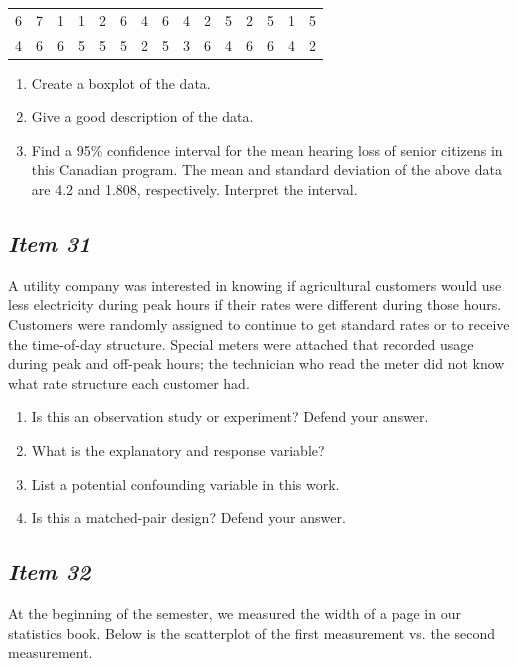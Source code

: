 \documentclass[twoside,openany]{tufte-book}
\begin{document}
\begin{table}[!ht]
\begin{center}
\begin{tabular}{lllllllllllllll}
6 & 7 & 1 & 1 & 2 & 6 & 4 & 6 & 4 & 2 & 5 & 2 & 5 & 1&  5\\
4 & 6 & 6 & 5 & 5 & 5 & 2 & 5 & 3 & 6 & 4 & 6 & 6 & 4 & 2\\
\end{tabular}
\end{center}
\end{table}
 
\begin{enumerate}[leftmargin=1cm, itemsep=.2em]
\item Create a boxplot of the data.
\item Give a good description of the data.
\item Find a 95\% confidence interval for the mean hearing loss of senior citizens in this Canadian program.   The mean and standard deviation of the above data are 4.2 and 1.808, respectively. Interpret the interval.
\end{enumerate}

\subsection{\textbf{\textit{Item 31}}}
A utility company was interested in knowing if agricultural customers would use less electricity during peak hours if their rates were different during those hours.  Customers were randomly assigned to continue to get standard rates or to receive the time-of-day structure.  Special meters were attached that recorded usage during peak and off-peak hours; the technician who read the meter did not know what rate structure each customer had.
\begin{enumerate}[leftmargin=1cm, itemsep=.2em]
\item Is this an observation study or experiment?  Defend your answer.
\item What is the explanatory and response variable?
\item List a potential confounding variable in this work.
\item Is this a matched-pair design?  Defend your answer.
\end{enumerate}

\newpage

\subsection{\textbf{\textit{Item 32}}}
At the beginning of the semester, we measured the width of a page in our statistics book.  Below is the scatterplot of the first measurement vs. the second measurement. 
\end{document}
